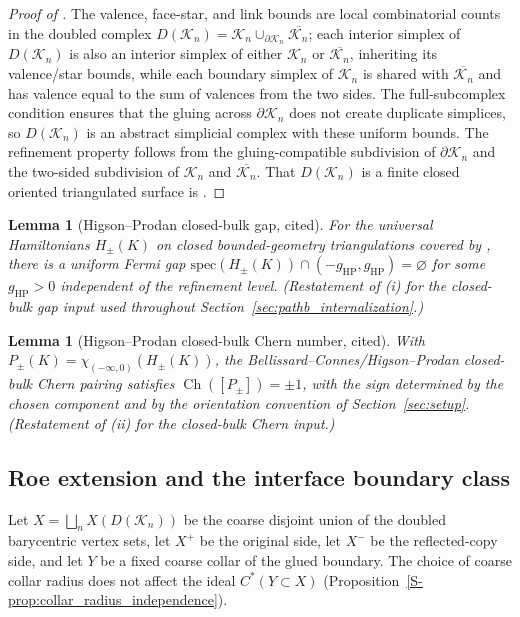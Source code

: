 \documentclass[11pt]{article}
\numberwithin{equation}{section}
\newtheorem{lemma}[theorem]{Lemma}
\theoremstyle{definition}
\theoremstyle{remark}
\newcommand{\K}{\mathcal{K}}
\newcommand{\bd}{\partial}
\newcommand{\spec}{\mathrm{spec}}
\newcommand{\Ch}{\operatorname{Ch}}
\begin{document}
\begin{proof}[Proof of ]
The valence, face-star, and link bounds are local combinatorial counts in the doubled complex
\(D(\K_n)=\K_n\cup_{\bd\K_n}\overline{\K_n}\); each interior simplex of \(D(\K_n)\) is also an
interior simplex of either \(\K_n\) or \(\overline{\K_n}\), inheriting its valence/star
bounds, while each boundary simplex of \(\K_n\) is shared with \(\overline{\K_n}\) and has
valence equal to the sum of valences from the two sides. The full-subcomplex condition
 ensures that the gluing across \(\bd\K_n\) does not create duplicate
simplices, so \(D(\K_n)\) is an abstract simplicial complex with these uniform bounds. The
refinement property follows from the gluing-compatible subdivision of \(\bd\K_n\) and the
two-sided subdivision of \(\K_n\) and \(\overline{\K_n}\). That \(D(\K_n)\) is a finite
closed oriented triangulated surface is .
\end{proof}

\begin{lemma}[Higson--Prodan closed-bulk gap, cited]\label{lem:pathb_hp_gap}
For the universal Hamiltonians \(H_\pm(K)\) on closed bounded-geometry triangulations covered
by , there is a uniform Fermi gap
\(\spec(H_\pm(K))\cap(-g_{\mathrm{HP}},g_{\mathrm{HP}})=\varnothing\) for some
\(g_{\mathrm{HP}}>0\) independent of the refinement level. (Restatement of
(i) for the closed-bulk gap input used throughout
Section~\ref{sec:pathb_internalization}.)
\end{lemma}

\begin{lemma}[Higson--Prodan closed-bulk Chern number, cited]\label{lem:pathb_hp_chern}
With \(P_\pm(K)=\chi_{(-\infty,0)}(H_\pm(K))\), the Bellissard--Connes/Higson--Prodan closed-bulk
Chern pairing satisfies \(\Ch([P_\pm])=\pm1\), with the sign determined by the chosen component
and by the orientation convention of Section~\ref{sec:setup}. (Restatement of
(ii) for the closed-bulk Chern input.)
\end{lemma}

\subsection{Roe extension and the interface boundary class}

Let \(X=\bigsqcup_n X(D(\K_n))\) be the coarse disjoint union of the doubled barycentric vertex
sets, let \(X^+\) be the original side, let \(X^-\) be the reflected-copy side, and let \(Y\) be a
fixed coarse collar of the glued boundary. The choice of coarse collar radius does not affect the
ideal $C^*(Y\subset X)$ (Proposition~\ref{S-prop:collar_radius_independence}).
\end{document}
